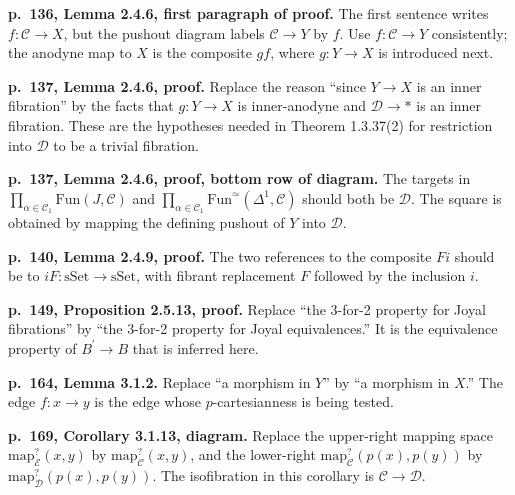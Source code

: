 \par{}
\noindent\textbf{p.~136, Lemma 2.4.6, first paragraph of proof.}\enspace
The first sentence writes $f\colon\mathcal C\to X$, but the pushout diagram labels $\mathcal C\to Y$ by $f$. Use $f\colon\mathcal C\to Y$ consistently; the anodyne map to $X$ is the composite $gf$, where $g\colon Y\to X$ is introduced next.

\par{}
\noindent\textbf{p.~137, Lemma 2.4.6, proof.}\enspace
Replace the reason ``since $Y\to X$ is an inner fibration'' by the facts that $g\colon Y\to X$ is inner-anodyne and $\mathcal D\to *$ is an inner fibration. These are the hypotheses needed in Theorem 1.3.37(2) for restriction into $\mathcal D$ to be a trivial fibration.

\par{}
\begingroup\raggedright
\noindent\textbf{p.~137, Lemma 2.4.6, proof, bottom row of diagram.}\enspace
The targets in $\prod_{\alpha\in\mathcal C_1}\mathrm{Fun}(J,\mathcal C)$ and $\prod_{\alpha\in\mathcal C_1}\mathrm{Fun}^{\simeq}(\Delta^1,\mathcal C)$ should both be $\mathcal D$. The square is obtained by mapping the defining pushout of $Y$ into $\mathcal D$.
\par\endgroup

\par{}
\noindent\textbf{p.~140, Lemma 2.4.9, proof.}\enspace
The two references to the composite $Fi$ should be to $iF\colon\mathrm{sSet}\to\mathrm{sSet}$, with fibrant replacement $F$ followed by the inclusion $i$.

\par{}
\noindent\textbf{p.~149, Proposition 2.5.13, proof.}\enspace
Replace ``the 3-for-2 property for Joyal fibrations'' by ``the 3-for-2 property for Joyal equivalences.'' It is the equivalence property of $B^{\prime}\to B$ that is inferred here.

\par{}
\noindent\textbf{p.~164, Lemma 3.1.2.}\enspace
Replace ``a morphism in $Y$'' by ``a morphism in $X$.'' The edge $f\colon x\to y$ is the edge whose $p$-cartesianness is being tested.

\par{}
\noindent\textbf{p.~169, Corollary 3.1.13, diagram.}\enspace
Replace the upper-right mapping space $\mathrm{map}^{?}_{\mathcal E}(x,y)$ by $\mathrm{map}^{?}_{\mathcal C}(x,y)$, and the lower-right $\mathrm{map}^{?}_{\mathcal C}(p(x),p(y))$ by $\mathrm{map}^{?}_{\mathcal D}(p(x),p(y))$. The isofibration in this corollary is $\mathcal C\to\mathcal D$.

